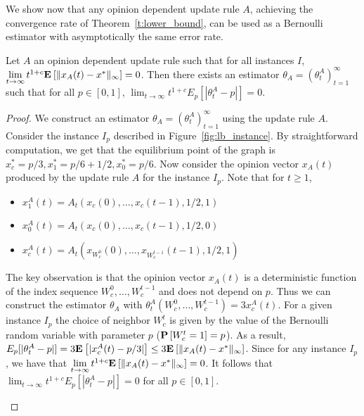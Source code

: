 We show now that any opinion dependent update rule $A$, achieving the
convergence rate of Theorem~\ref{t:lower_bound}, can be used as a Bernoulli
estimator with asymptotically the same error rate.
\begin{lemma}\label{l:reduction}
  Let $A$ an opinion dependent update rule such that for all instances $I$,
  $\lim \limits_{t \rightarrow \infty} t^{1+c}
  \bm{\mathrm{E}}_{} \left[ \| x_A(t)-x^* \|_{\infty} \right]=0$.
  Then there exists an estimator $\theta_A=(\theta_t^A)_{t=1}^\infty$ such that for all
  $p \in [0,1]$,
  \(\lim_{t \rightarrow \infty}t^{1+c}E_p[|\theta_t^A-p|]=0.\)
\end{lemma}
\begin{proof}
  We construct an estimator $\theta_A = (\theta^A_t)_{t=1}^\infty$
  using the update rule $A$. Consider the instance $I_p$ described in
  Figure~\ref{fig:lb_instance}.
  By straightforward computation, we get that the equilibrium point of
  the graph is $x_c^* = p/3, x_1^* = p/6+1/2, x_0^* = p/6$.
  Now consider the opinion vector $x_A(t)$ produced by the update
  rule $A$ for the instance $I_p$. Note that for $t \geq 1$,
  \begin{itemize}
   \item  $x_1^A(t)=A_t(x_c(0),\ldots,x_c(t-1),1/2,1)$
   \item  $x_0^A(t)=A_t(x_c(0),\ldots,x_c(t-1),1/2,0)$
   \item  $x_c^A(t)=A_t(x_{W_c^0}(0),\ldots,x_{W_c^{t-1}}(t-1),1/2,1)$
  \end{itemize}
  The key observation is that the opinion vector $x_A(t)$ is a deterministic function
  of the index sequence $W_c^0,\ldots,W_c^{t-1}$ and does not depend on $p$. Thus we
  can construct the estimator $\theta_A$ with $\theta_t^A(W_c^0,\ldots,W_c^{t-1}) = 3x_c^A(t)$.
  For a given instance $I_p$ the choice of neighbor $W_c^t$ is given by the value of
  the Bernoulli random variable with parameter $p$ ($\bm{\mathrm{P}}\left[W_c^t=1\right]=p$). As a result,
  $E_p[|\theta_t^A-p|]= 3\bm{\mathrm{E}}_{} \left[ |x_c^A(t)-p/3| \right]\leq 3\bm{\mathrm{E}}_{} \left[ \| x_A(t)-x^* \|_{\infty} \right]$.
  Since for any instance $I_p$, we have that $\lim \limits_{t \rightarrow \infty} t^{1+c}\bm{\mathrm{E}}_{} \left[ \| x_A(t)-x^* \|_{\infty} \right]=0$.
  It follows that $\lim_{t \rightarrow \infty}t^{1+c}E_p[|\theta_t^A -p|]=0$ for all $p \in [0,1]$.
  \vspace{-5mm}
  \begin{figure}

\end{figure}
\end{proof}
